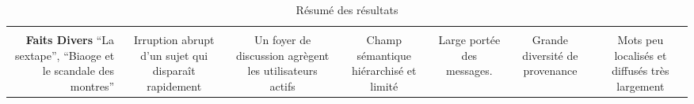 \begin{table}[h!]
\begin{minipage}{20.5cm}
\begin{turn}{90}
\begin{tabulary}{\linewidth}{ R | C C C C C C}
        \hline \\[-1.2ex]
        \textbf{Faits Divers}  \newline
        \small{``La sextape'', ``Biaoge et le scandale des montres''} &
        Irruption abrupt d'un sujet qui disparaît rapidement &
        Un foyer de discussion agrègent les utilisateurs actifs &
        Champ sémantique hiérarchisé et limité &
        Large portée des messages. &
        Grande diversité de provenance &
        Mots peu localisés et diffusés très largement \\

    \end{tabulary}
    \end{turn}
    \end{minipage}
    \caption[Résumé des résultats]{Résumé des résultats}
    \label{fig:viz-results}
\end{table}
\newpage